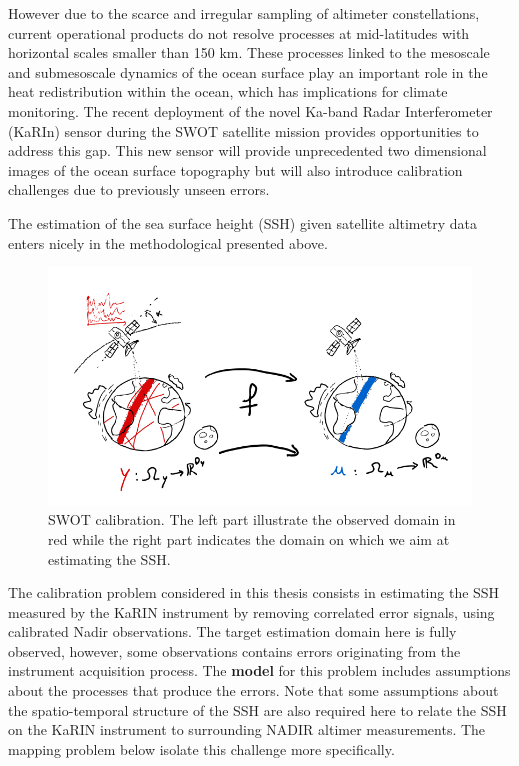 \begin{bibunit}
However due to the scarce and irregular sampling of altimeter constellations, current operational products do not resolve processes at mid-latitudes with horizontal scales smaller than 150 km\cite{ballarottaResolutionsOceanAltimetry2019}.
These processes linked to the mesoscale and submesoscale dynamics of the ocean surface play an important role in the heat redistribution within the ocean, which has implications for climate monitoring.
The recent deployment of the novel Ka-band Radar Interferometer (KaRIn) sensor during the SWOT satellite mission\cite{KaRInSWOTCharacteristics} provides opportunities to address this gap.
This new sensor will provide unprecedented two dimensional images of the ocean surface topography but will also introduce calibration challenges\cite{EmpiricalCrossCalibrationCoherent} due to previously unseen errors.

The estimation of the sea surface height (SSH) given satellite altimetry data enters nicely in the methodological presented above.

  \begin{figure}
      \centering
            \includegraphics[width=\linewidth]{Introduction/pics/calib_task.png}    
      \caption{SWOT calibration. The left part illustrate the observed domain in red while the right part indicates the domain on which we aim at estimating the SSH.}
      \label{fig:calibration_task}
  \end{figure}
The calibration problem considered in this thesis consists in estimating the SSH measured by the KaRIN instrument by removing  correlated error signals, using calibrated Nadir observations. The target estimation domain here is fully observed, however, some observations contains errors originating from the instrument acquisition process. The \textbf{model} for this problem includes assumptions about the processes that produce the errors. Note that some assumptions about the spatio-temporal structure of the SSH are also required here to relate the SSH on the KaRIN instrument to surrounding  NADIR altimer measurements. The mapping problem below isolate this challenge more specifically.


\end{bibunit}

